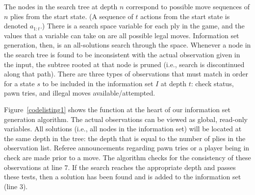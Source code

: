 \documentclass[10pt, conference, compsocconf]{IEEEtran}
\begin{document}
The nodes in the search tree at depth $n$ correspond to possible move 
sequences of $n$ plies from the start state.  (A sequence of $t$ actions from
the start state is denoted $a_{1:t}$.) There is a search space variable for
each ply in the game, and the values that a variable can take on are all
possible legal moves.  Information set generation, then, is an all-solutions
search through the space.  Whenever a node in the search tree is found to be
inconsistent with the actual observation given in the input, the subtree rooted
at that node is pruned (i.e., search is discontinued along that path).  There
are three types of observations that must match in order for a state $s$ to be
included in the information set $I$ at depth $t$: check status, pawn tries, and
illegal moves available/attempted.


Figure~\ref{codelisting1} shows the function at the heart of our information set generation algorithm.  The actual
observations can be viewed as global, read-only variables.  All solutions (i.e., all nodes in the information set) will
be located at the same depth in the tree: the depth that is equal to the number of plies in the observation list.
Referee announcements regarding pawn tries or a player being in check are made prior to a move.  The algorithm checks
for the consistency of these observations at line $7$.  If the search reaches the appropriate depth and passes these
tests, then a solution has been found and is added to the information set (line $3$).  
\end{document}
